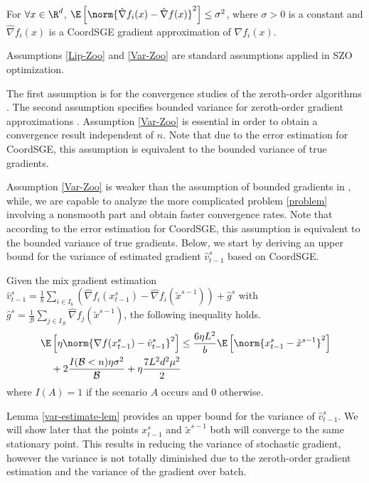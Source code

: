 \begin{assumption}\label{Var-Zoo}
For $\forall x\in\R^d$, $\E\left[\norm{\hat{\nabla} f_i(x) - \hat{\nabla} f(x)}^2\right] \leq \sigma^2$, where $\sigma > 0$ is a constant and $\hat{\nabla} f_i(x)$ is a CoordSGE gradient approximation of $\nabla f_i(x)$.
\end{assumption}
Assumptions \ref{Lip-Zoo} and \ref{Var-Zoo} are standard assumptions applied in SZO optimization. 

The first assumption is for the convergence studies of the zeroth-order algorithms \cite{ghadimi2016accelerated,nesterov2017random,liu2018zeroth}. The second assumption specifies bounded variance for zeroth-order gradient approximations \cite{lian2016comprehensive,liu2018stochastic,liu2018zeroth}. 
Assumption \ref{Var-Zoo} is essential in order to obtain a convergence result independent of $n$.
Note that due to the error estimation for CoordSGE, this assumption is equivalent to the bounded  variance of true gradients. 

Assumption \ref{Var-Zoo} is weaker than the assumption of bounded gradients in \cite{liu2017zeroth,hajinezhad2019zone},
while, we are capable to analyze the more complicated problem \eqref{problem} involving a nonsmooth part and obtain faster convergence rates. Note that according to the error estimation for CoordSGE, this assumption is equivalent to the bounded  variance of true gradients.
Below, we start by deriving an upper bound for the variance of estimated gradient $\hat{v}_{t-1}^s$ based on CoordSGE. 
\begin{lemma}\label{var-estimate-lem}
Given the mix gradient estimation $\hat{v}_{t-1}^s = \frac{1}{b} \sum_{i\in I_b}\left(\hat{\nabla} f_{i}(x_{t-1}^s)-\hat{\nabla} f_{i}(\tilde{x}^{s-1})\right)+\hat{g}^s$ with $\hat{g}^s = \frac{1}{\mathcal{B}} \sum_{j\in I_{\mathcal{B}}} \hat{\nabla} f_j (\tilde{x}^{s-1})$, the following inequality holds. 
\begin{align}
\E&\left[\eta\norm{\nabla f(x_{t-1}^s)-{\hat{v}_{t-1}^s}}^2\right] \leq  \frac{6\eta L^2}{b}\E\left[\norm{x_{t-1}^s-\tilde{x}^{s-1}}^2\right]\notag\\
&+ 2\frac{I(\mathcal{B} < n)\eta \sigma ^2}{\mathcal{B}}+\eta \frac{7 L^2 d^2 \mu^2}{2}
\end{align}
where $I(A) = 1$ if the scenario $A$ occurs and $0$ otherwise.
\end{lemma}

Lemma \ref{var-estimate-lem} provides an upper bound for the variance of $\hat{v}_{t-1}^s$.  We will show later that the points $x_{t-1}^s$ and $\tilde{x}^{s-1}$ both will converge to the same stationary point.  This results in reducing the variance of stochastic gradient, however the variance is not totally diminished due to the zeroth-order gradient estimation and the variance of the gradient over batch.

